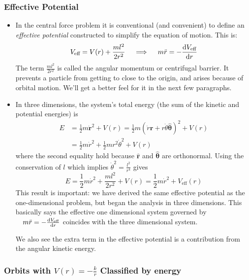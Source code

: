 \documentclass[11pt, a4paper]{article}
\newcommand{\bdot}[1]{\dot{\bm{#1}}} %
\newcommand{\uvec}[1]{\bm{\hat{\mathbf{#1}}}} %
\newcommand{\veff}{V_{\text{eff}}}  %
\begin{document}
\subsubsection{Effective Potential}
\begin{itemize}
	\item In the central force problem it is conventional (and convenient) to define an \textit{effective potential} constructed to simplify the equation of motion. This is:
	\begin{equation*}
		\veff = V(r) + \frac{ml^{2}}{2r^{2}} \quad \implies \quad m \ddot{r} = - \dv{\veff}{r} 
	\end{equation*}
	The term $ \frac{ml^{2}}{2r^{2}} $ is called the angular momentum or centrifugal barrier. It prevents a particle from getting to close to the origin, and arises because of orbital motion. We'll get a better feel for it in the next few paragraphs.
	
	\item In three dimensions, the system's total energy (the sum of the kinetic and potential energies) is
	\begin{align*}
		E &= \frac{1}{2}m \bdot{r}^{2} + V(r) = \frac{1}{2}m \left (\dot{r}\uvec{r} + r \dot{\theta} \uvec{\theta}\right )^{2} + V(r)\\
		&= \frac{1}{2}m\dot{r}^{2} + \frac{1}{2}mr^{2} \dot{\theta}^{2} + V(r)
	\end{align*}
	where the second equality hold because $ \uvec{r} $ and $ \uvec{\theta} $ are orthonormal. Using the conservation of $ l $ which implies $ \dot{\theta}^{2} = \frac{l^{2}}{r^{4}} $ gives
	\begin{equation*}
		E = \frac{1}{2}m\dot{r}^{2} + \frac{ml^{2}}{2r^{2}} + V(r) = \frac{1}{2}m\dot{r}^{2} + \veff(r)
	\end{equation*}
	This result is important: we have derived the same effective potential as the one-dimensional problem, but began the analysis in three dimensions. This basically says the effective one dimensional system governed by $ \quad m \ddot{r} = - \dv{\veff}{r}  $ coincides with the	three dimensional system. 
	
	We also see the extra term in the effective potential is a contribution from the angular kinetic energy.
	
\end{itemize}

\subsubsection{Orbits with $ V(r) = -\frac{k}{r} $ Classified by energy} 
\end{document}
